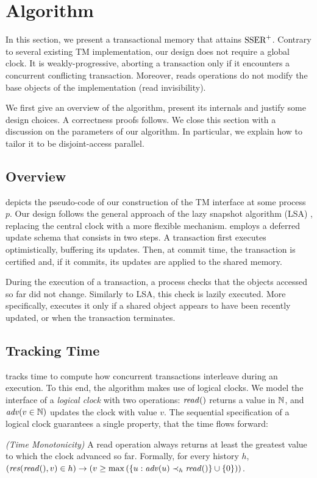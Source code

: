 \section{Algorithm}

In this section, we present a transactional memory that attains $\SPSER$.
Contrary to several existing TM implementation, our design does not require a global clock.
It is weakly-progressive, aborting a transaction only if it encounters a concurrent conflicting transaction.
Moreover, reads operations do not modify the base objects of the implementation (read invisibility).

We first give an overview of the algorithm, present its internals and justify some design choices.
A correctness proofs follows.
We close this section with a discussion on the parameters of our algorithm.
In particular, we explain how to tailor it to be disjoint-access parallel.

\subsection{Overview}

 depicts the pseudo-code of our construction of the TM interface at some process $p$.
Our design follows the general approach of the lazy snapshot algorithm (LSA) \cite{FelberFMR10}, replacing the central clock with a more flexible mechanism.
 employs a deferred update schema that consists in two steps.
A transaction first executes optimistically, buffering its updates.
Then, at commit time, the transaction is certified and, if it commits, its updates are applied to the shared memory.

During the execution of a transaction, a process checks that the objects accessed so far did not change.
Similarly to LSA, this check is lazily executed.
More specifically,  executes it only if a shared object appears to have been recently updated, or when the transaction terminates.

\subsection{Tracking Time}

 tracks time to compute how concurrent transactions interleave during an execution.
To this end, the algorithm makes use of logical clocks.
We model the interface of a \emph{logical clock} with two operations: $\cread$ returns a value in $\naturalSet$, and $\cadv(v \in \naturalSet)$ updates the clock with value $v$.
The sequential specification of a logical clock guarantees a single property, that the time flows forward:
\begin{inparaenum}
\item[\emph{(Time Monotonicity)}]
  A read operation always returns at least the greatest value to which the clock advanced so far.
  Formally, for every history $h$, $(\responseAny{\cread}{v} \in h) \implies (v \geq \max{(\{u : \cadv(u) \hb_h \cread \} \union \{0\})})$.
\end{inparaenum}

